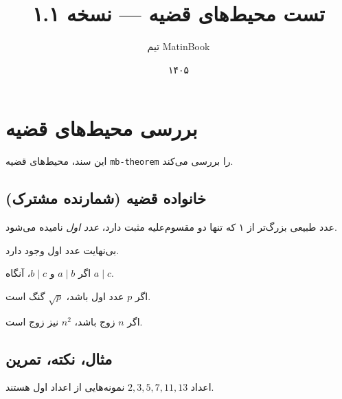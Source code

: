 \documentclass{matinbook}
\title{تست محیط‌های قضیه — نسخه ۱.۱}
\author{تیم MatinBook}
\date{۱۴۰۵}
\begin{document}
\maketitle

\chapter{بررسی محیط‌های قضیه}
\label{chap:test-theorem}

این سند، محیط‌های قضیه \texttt{mb-theorem} را بررسی می‌کند.

\section{خانواده قضیه (شمارنده مشترک)}
\label{sec:theorem-family}

\begin{definition}
    عدد طبیعی بزرگ‌تر از ۱ که تنها دو مقسوم‌علیه مثبت دارد،
    \emph{عدد اول} نامیده می‌شود.
    \label{def:prime}
\end{definition}

\begin{theorem}
    بی‌نهایت عدد اول وجود دارد.
    \label{thm:euclid}
\end{theorem}

\begin{lemma}
    اگر $a \mid b$ و $b \mid c$، آنگاه $a \mid c$.
    \label{lem:divisibility}
\end{lemma}

\begin{corollary}
    اگر $p$ عدد اول باشد، $\sqrt{p}$ گنگ است.
    \label{cor:sqrt-prime}
\end{corollary}

\begin{proposition}
    اگر $n$ زوج باشد، $n^2$ نیز زوج است.
    \label{prop:even-square}
\end{proposition}

\section{مثال، نکته، تمرین}
\label{sec:example-remark-exercise}

\begin{example}
    اعداد $2, 3, 5, 7, 11, 13$ نمونه‌هایی از اعداد اول هستند.
    \label{ex:small-primes}
\end{example}
\end{document}
